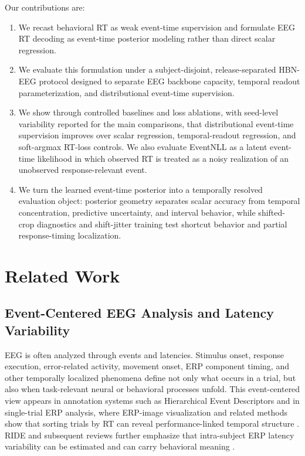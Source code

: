 \documentclass[12pt]{article}
\begin{document}
Our contributions are:
\begin{enumerate}
    \item We recast behavioral RT as weak event-time supervision and formulate EEG RT decoding as event-time posterior modeling rather than direct scalar regression.
    \item We evaluate this formulation under a subject-disjoint, release-separated HBN-EEG protocol designed to separate EEG backbone capacity, temporal readout parameterization, and distributional event-time supervision.
    \item We show through controlled baselines and loss ablations, with seed-level variability reported for the main comparisons, that distributional event-time supervision improves over scalar regression, temporal-readout regression, and soft-argmax RT-loss controls. We also evaluate EventNLL as a latent event-time likelihood in which observed RT is treated as a noisy realization of an unobserved response-relevant event.
    \item We turn the learned event-time posterior into a temporally resolved evaluation object: posterior geometry separates scalar accuracy from temporal concentration, predictive uncertainty, and interval behavior, while shifted-crop diagnostics and shift-jitter training test shortcut behavior and partial response-timing localization.
\end{enumerate}

\section{Related Work}

\subsection{Event-Centered EEG Analysis and Latency Variability}
EEG is often analyzed through events and latencies. Stimulus onset, response execution, error-related activity, movement onset, ERP component timing, and other temporally localized phenomena define not only what occurs in a trial, but also when task-relevant neural or behavioral processes unfold. This event-centered view appears in annotation systems such as Hierarchical Event Descriptors \citep{BigdelyShamlo2016HED} and in single-trial ERP analysis, where ERP-image visualization and related methods show that sorting trials by RT can reveal performance-linked temporal structure \citep{Jung1998SingleTrialERP}. RIDE and subsequent reviews further emphasize that intra-subject ERP latency variability can be estimated and can carry behavioral meaning \citep{Ouyang2011RIDE,Ouyang2017LatencyReview}.
\end{document}
